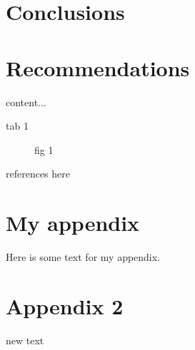 \documentclass[12pt]{article}
\providecommand{\Appendix}[1]{
	\pagebreak
	\setcounter{page}{1}
	\renewcommand{\thepage}{\thesection -\arabic{page}}
	\section{#1}
}
\begin{document}
\section{Conclusions}

\section{Recommendations}


	\begin{table} [h]
		content...
		\caption{tab 1}
	\end{table}

	\begin{figure} [h]
		\caption{fig 1}
	\end{figure}
	
\pagebreak



\pagebreak
{}

references here
%
%





\begin{appendices}
	
	\Appendix{My appendix}
	Here is some text for my appendix.
	
	\Appendix{Appendix 2}
	new text
	
	\pagebreak
\end{appendices}
\end{document}
